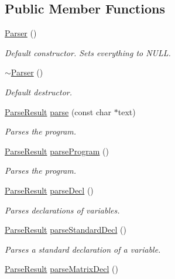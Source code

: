 \subsection*{Public Member Functions}
\begin{DoxyCompactItemize}
\item 
\hyperlink{classParser_a12234f6cd36b61af4b50c94a179422c1}{Parser} ()
\begin{DoxyCompactList}\small\item\em Default constructor. Sets everything to N\-U\-L\-L. \end{DoxyCompactList}\item 
\hyperlink{classParser_a3e658b5917a93a3ef648050d060e3a93}{$\sim$\-Parser} ()
\begin{DoxyCompactList}\small\item\em Default destructor. \end{DoxyCompactList}\item 
\hyperlink{classParseResult}{Parse\-Result} \hyperlink{classParser_a2c1a7aa0b09a43bc1eef460817efb1d6}{parse} (const char $\ast$text)
\begin{DoxyCompactList}\small\item\em Parses the program. \end{DoxyCompactList}\item 
\hyperlink{classParseResult}{Parse\-Result} \hyperlink{classParser_a14e25c84322809e2f060dc530362ea71}{parse\-Program} ()
\begin{DoxyCompactList}\small\item\em Parses the program. \end{DoxyCompactList}\item 
\hyperlink{classParseResult}{Parse\-Result} \hyperlink{classParser_ac646227983887c1cd13dae67fa1bc142}{parse\-Decl} ()
\begin{DoxyCompactList}\small\item\em Parses declarations of variables. \end{DoxyCompactList}\item 
\hyperlink{classParseResult}{Parse\-Result} \hyperlink{classParser_a1e1f83c0f4b11148a356d951f191425e}{parse\-Standard\-Decl} ()
\begin{DoxyCompactList}\small\item\em Parses a standard declaration of a variable. \end{DoxyCompactList}\item 
\hyperlink{classParseResult}{Parse\-Result} \hyperlink{classParser_a3a00df25fda2af308b69f05eed14ac69}{parse\-Matrix\-Decl} ()

\end{DoxyCompactItemize}
